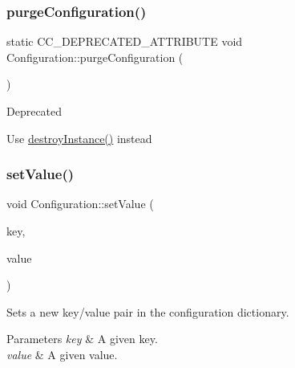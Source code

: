 \subsubsection{\texorpdfstring{purge\+Configuration()}{purgeConfiguration()}\hspace{0.1cm}{\footnotesize\ttfamily [2/2]}}
{\footnotesize\ttfamily static C\+C\+\_\+\+D\+E\+P\+R\+E\+C\+A\+T\+E\+D\+\_\+\+A\+T\+T\+R\+I\+B\+U\+TE void Configuration\+::purge\+Configuration (\begin{DoxyParamCaption}{ }\end{DoxyParamCaption})\hspace{0.3cm}{\ttfamily [static]}}

\begin{DoxyRefDesc}{Deprecated}
\item[\hyperlink{deprecated__deprecated000285}{Deprecated}]Use \hyperlink{classConfiguration_acbc9e73d16e5eb122e7daef71c955cf2}{destroy\+Instance()} instead \end{DoxyRefDesc}
\mbox{\label{classConfiguration_a33af625654620b5fe9fe0f644278424c}} 
\subsubsection{\texorpdfstring{set\+Value()}{setValue()}\hspace{0.1cm}{\footnotesize\ttfamily [1/2]}}
{\footnotesize\ttfamily void Configuration\+::set\+Value (\begin{DoxyParamCaption}\item[{const std\+::string \&}]{key,  }\item[{const \hyperlink{classValue}{Value} \&}]{value }\end{DoxyParamCaption})}

Sets a new key/value pair in the configuration dictionary.


\begin{DoxyParams}{Parameters}
{\em key} & A given key. \\
\hline
{\em value} & A given value. \\
\hline
\end{DoxyParams}
\mbox{\label{classConfiguration_a33af625654620b5fe9fe0f644278424c}} 

